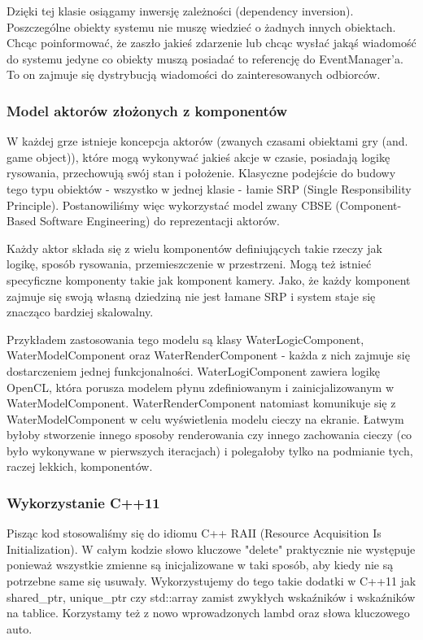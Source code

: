 \documentclass[polish, 12pt]{aghthesis}
\begin{document}
			Dzięki tej klasie osiągamy inwersję zależności (dependency inversion). Poszczególne obiekty systemu nie muszę wiedzieć o żadnych innych obiektach. Chcąc poinformować, że zaszło jakieś zdarzenie lub chcąc wysłać jakąś wiadomość do systemu jedyne co obiekty muszą posiadać to referencję do EventManager'a. To on zajmuje się dystrybucją wiadomości do zainteresowanych odbiorców.
		 
		\subsubsection{Model aktorów złożonych z komponentów}
		
			W każdej grze istnieje koncepcja aktorów (zwanych czasami obiektami gry (and. game object)), które mogą wykonywać jakieś akcje w czasie, posiadają logikę rysowania, przechowują swój stan i położenie. Klasyczne podejście do budowy tego typu obiektów - wszystko w jednej klasie - łamie SRP (Single Responsibility Principle). Postanowiliśmy więc wykorzystać model zwany CBSE (Component-Based Software Engineering) do reprezentacji aktorów. 
			
			Każdy aktor składa się z wielu komponentów definiujących takie rzeczy jak logikę, sposób rysowania, przemieszczenie w przestrzeni. Mogą też istnieć specyficzne komponenty takie jak komponent kamery. Jako, że każdy komponent zajmuje się swoją własną dziedziną nie jest łamane SRP i system staje się znacząco bardziej skalowalny. 
			
			Przykładem zastosowania tego modelu są klasy WaterLogicComponent, WaterModelComponent oraz WaterRenderComponent - każda z nich zajmuje się dostarczeniem jednej funkcjonalności. WaterLogiComponent zawiera logikę OpenCL, która porusza modelem płynu zdefiniowanym i zainicjalizowanym w WaterModelComponent. WaterRenderComponent natomiast komunikuje się z WaterModelComponent w celu wyświetlenia modelu cieczy na ekranie. Łatwym byłoby stworzenie innego sposoby renderowania czy innego zachowania cieczy (co było wykonywane w pierwszych iteracjach) i polegałoby tylko na podmianie tych, raczej lekkich, komponentów.
			
		\subsubsection{Wykorzystanie C++11}
		
		Pisząc kod stosowaliśmy się do idiomu C++ RAII (Resource Acquisition Is Initialization). W całym kodzie słowo kluczowe "delete" praktycznie nie występuje ponieważ wszystkie zmienne są inicjalizowane w taki sposób, aby kiedy nie są potrzebne same się usuwały. Wykorzystujemy do tego takie dodatki w C++11 jak shared\_ptr, unique\_ptr czy std::array zamist zwykłych wskaźników i wskaźników na tablice. Korzystamy też z nowo wprowadzonych lambd oraz słowa kluczowego auto.
		
\end{document}
